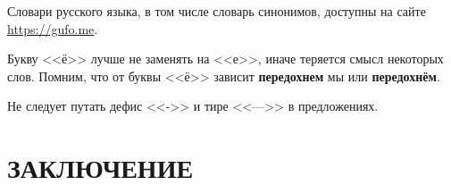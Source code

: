 \documentclass[14pt]{extarticle}
\begin{document}
Словари русского языка, в том числе словарь синонимов, доступны на сайте \href{https://gufo.me}{https://gufo.me}.

Букву <<ё>> лучше не заменять на <<е>>, иначе теряется смысл некоторых слов. Помним, что от буквы <<ё>> зависит \textbf{передохнем} мы или \textbf{передохнём}.

Не следует путать дефис <<->> и тире <<--->> в предложениях.

\section*[ЗАКЛЮЧЕНИЕ]{ЗАКЛЮЧЕНИЕ}

\newpage
\renewcommand{\refname}{\rubibliographyname} %
{}%
\end{document}
